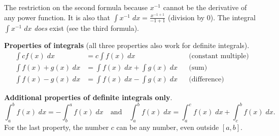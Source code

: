 \documentclass[../main.tex]{subfiles}
\begin{document}
{\footnotesize \faExclamationTriangle{} The restriction  on the second formula  because \(x^{-1}\) cannot be the derivative of any power function. It is also  that \(\textstyle \int x^{-1} \;dx = \frac{x^{-1 + 1}}{-1 + 1}\) (division by \(0\)). The integral \(\textstyle \int x^{-1} \;dx\) \emph{does} exist (see the third formula).}

\textbf{Properties of integrals} (all three properties also work for definite integrals).
\begin{align*}
  \int c f(x) \;dx 
    &= c \int f(x) \;dx && \text{(constant multiple)}\\
    \int f(x) + g(x) \;dx 
    &= \int f(x) \;dx + \int g(x) \;dx && \text{(sum)}\\
    \int f(x) - g(x) \;dx 
    &= \int f(x) \;dx - \int g(x) \;dx && \text{(difference)}
\end{align*}

\textbf{Additional properties of definite integrals only}.
\[
  \int_{a}^{b} f(x) \;dx = - \int_{b}^{a} f(x) \;dx 
  \quad\text{and}\quad
  \int_{a}^{b} f(x) \;dx = \int_{a}^{c} f(x) \;dx + \int_{c}^{b} f(x) \;dx.
\]
For the last property, the number \(c\) can be any number, even outside \([a,b]\).
\end{document}

